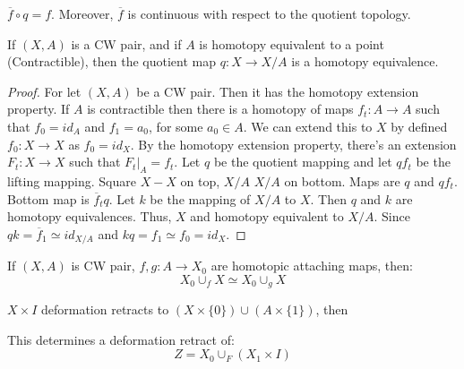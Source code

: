 \documentclass[crop=false,class=book,oneside]{standalone}
\begin{document}
            $\overline{f}\circ{q}=f$. Moreover, $\overline{f}$ is
            continuous with respect to the quotient topology.
            \begin{theorem}
                If $(X,A)$ is a CW pair, and if $A$ is
                homotopy equivalent to a point
                (Contractible), then the quotient map
                $q:X\rightarrow{X/A}$ is a homotopy
                equivalence.
            \end{theorem}
            \begin{proof}
                For let $(X,A)$ be a CW pair. Then it has the
                homotopy extension property. If $A$ is contractible
                then there is a homotopy of maps
                $f_{t}:A\rightarrow{A}$ such that $f_{0}=id_{A}$ and
                $f_{1}=a_{0}$, for some $a_{0}\in{A}$. We can
                extend this to $X$ by defined
                $f_{0}:X\rightarrow{X}$ as $f_{0}=id_{X}$. By
                the homotopy extension property, there's an
                extension $F_{t}:X\rightarrow{X}$ such that
                $F_{t}|_{A}=f_{t}$. Let $q$ be the quotient
                mapping and let $qf_{t}$ be the lifting mapping.
                Square $X-X$ on top, $X/A$ $X/A$ on bottom. Maps are
                $q$ and $qf_{t}$. Bottom map is
                $\overline{f}_{t}q$. Let $k$ be the mapping
                of $X/A$ to $X$. Then $q$ and $k$ are homotopy
                equivalences. Thus, $X$ and homotopy equivalent
                to $X/A$. Since $qk=\overline{f}_{1}\simeq{id}_{X/A}$
                and $kq=f_{1}\simeq{f}_{0}=id_{X}$.
            \end{proof}
            \begin{theorem}
                If $(X,A)$ is CW pair, $f,g:A\rightarrow{X_{0}}$
                are homotopic attaching maps, then:
                \begin{equation}
                    X_{0}\cup_{f}X\simeq{X}_{0}\cup_{g}X
                \end{equation}
            \end{theorem}
            \begin{theorem}
                $X\times{I}$ deformation retracts to
                $(X\times\{0\})\cup(A\times\{1\})$, then
            \end{theorem}
            This determines a deformation retract of:
            \begin{equation}
                Z=X_{0}\cup_{F}(X_{1}\times{I})
            \end{equation}
\end{document}
